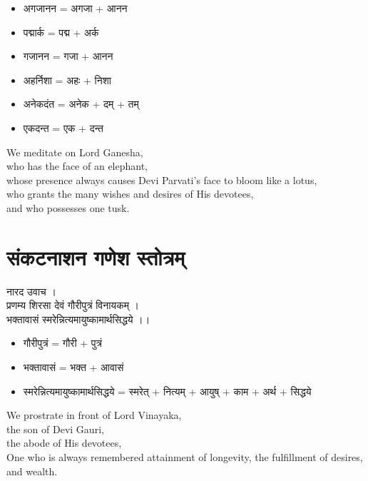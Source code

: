 \documentclass{book}
\newenvironment{Verse}[1][]
  {\bigskip\noindent\begin{center}\begin{adjustbox}{valign=M}\begin{tcolorbox}[colframe=black,colback=white,boxrule=0.5mm,arc=4mm,auto outer arc,left=2mm,right=2mm,top=2mm,bottom=2mm,halign=center]
  \LARGE\bfseries#1\par\varwidth{\linewidth}\centering}
  {\endvarwidth\end{tcolorbox}\end{adjustbox}\end{center}\bigskip}
\begin{document}
\begin{multicols}{2}
    \setlength{\columnseprule}{0.4pt}
    \begin{itemize}
        \item अगजानन = अगजा + आनन
        \item पद्मार्क = पद्म + अर्क
        \item गजानन = गजा + आनन
        \item अहर्निशा = अहः + निशा
        \item अनेकदंत = अनेक + दम्  + तम्
        \item एकदन्त = एक + दन्त
    \end{itemize}

    \columnbreak
    
    \vspace{10pt}
    \textenglish{
        \noindent We meditate on Lord Ganesha,\\
        who has the face of an elephant,\\
        whose presence always causes Devi Parvati's face to bloom like a lotus,\\
        who grants the many wishes and desires of His devotees,\\
        and who possesses one tusk.
    }

\end{multicols}

\clearpage

\section{संकटनाशन गणेश स्तोत्रम्}

\begin{Verse}
    नारद उवाच ।\\
    प्रणम्य शिरसा देवं गौरीपुत्रं विनायकम् ।\\
    भक्तावासं स्मरेन्नित्यमायुष्कामार्थसिद्धये ।।
\end{Verse}


\begin{multicols}{2}
    \setlength{\columnseprule}{0.4pt}
    \begin{itemize}
        \item गौरीपुत्रं = गौरी + पुत्रं
        \item भक्तावासं = भक्त + आवासं
        \item स्मरेन्नित्यमायुष्कामार्थसिद्धये = स्मरेत् + नित्यम् + आयुष् + काम + अर्थ + सिद्धये
    \end{itemize}

    \columnbreak
    
    \vspace{10pt}
    \textenglish{
        \noindent We prostrate in front of Lord Vinayaka,\\
        the son of Devi Gauri,\\
        the abode of His devotees,\\
        One who is always remembered attainment of longevity, the fulfillment of desires, and wealth.
    }

\end{multicols}
\end{document}
